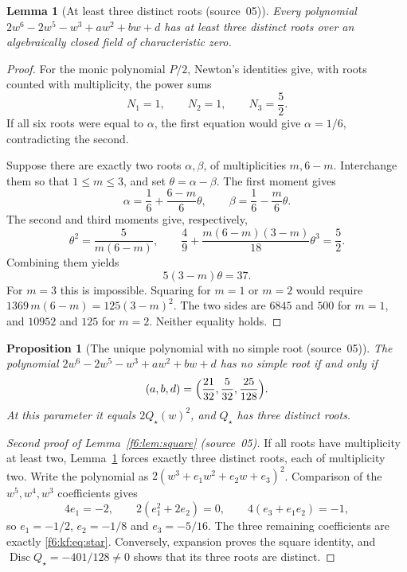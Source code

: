 \documentclass[11pt,a4paper]{article}
\newtheorem{lemma}[theorem]{Lemma}
\newtheorem{proposition}[theorem]{Proposition}
\theoremstyle{definition}
\newcommand{\Disc}{\operatorname{Disc}}
\newcommand{\src}[1]{\textup{(source~#1)}}
\begin{document}
\begin{lemma}[At least three distinct roots \src{05}]\label{f6:kf:lem:threeroots}
Every polynomial $2w^6-2w^5-w^3+aw^2+bw+d$ has at least three distinct roots
over an algebraically closed field of characteristic zero.
\end{lemma}
\begin{proof}
For the monic polynomial $P/2$, Newton's identities give, with roots counted
with multiplicity, the power sums
\begin{equation}\label{f6:kf:eq:newton}
N_1=1,\qquad N_2=1,\qquad N_3=\frac52 .
\end{equation}
If all six roots were equal to $\alpha$, the first equation would give
$\alpha=1/6$, contradicting the second.

Suppose there are exactly two roots $\alpha,\beta$, of multiplicities
$m,6-m$. Interchange them so that $1\le m\le3$, and set
$\theta=\alpha-\beta$. The first moment gives
\[
\alpha=\frac16+\frac{6-m}{6}\theta,\qquad \beta=\frac16-\frac m6\theta .
\]
The second and third moments give, respectively,
\[
\theta^2=\frac5{m(6-m)},\qquad
\frac49+\frac{m(6-m)(3-m)}{18}\theta^3=\frac52 .
\]
Combining them yields
\begin{equation}\label{f6:kf:eq:tworootobstruction}
5(3-m)\theta=37 .
\end{equation}
For $m=3$ this is impossible. Squaring for $m=1$ or $m=2$ would require
$1369\,m(6-m)=125(3-m)^2$. The two sides are $6845$ and $500$ for $m=1$, and
$10952$ and $125$ for $m=2$. Neither equality holds.
\end{proof}

\begin{proposition}[The unique polynomial with no simple root \src{05}]
\label{f6:kf:prop:square}
The polynomial $2w^6-2w^5-w^3+aw^2+bw+d$ has no simple root if and only if
\begin{equation}\label{f6:kf:eq:star}
(a,b,d)=\Bigl(\frac{21}{32},\frac5{32},\frac{25}{128}\Bigr).
\end{equation}
At this parameter it equals $2Q_\star(w)^2$, and $Q_\star$ has three distinct
roots.
\end{proposition}
\begin{proof}[Second proof of Lemma~\ref{f6:lem:square} \src{05}]
If all roots have multiplicity at least two, Lemma~\ref{f6:kf:lem:threeroots}
forces exactly three distinct roots, each of multiplicity two. Write the
polynomial as $2(w^3+e_1w^2+e_2w+e_3)^2$. Comparison of the $w^5,w^4,w^3$
coefficients gives
\[
4e_1=-2,\qquad 2(e_1^2+2e_2)=0,\qquad 4(e_3+e_1e_2)=-1,
\]
so $e_1=-1/2$, $e_2=-1/8$ and $e_3=-5/16$. The three remaining coefficients
are exactly \eqref{f6:kf:eq:star}. Conversely, expansion proves the square
identity, and $\Disc Q_\star=-401/128\ne0$ shows that its three roots are
distinct.
\end{proof}
\end{document}
